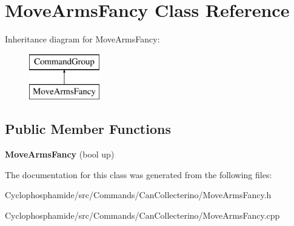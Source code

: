 \hypertarget{class_move_arms_fancy}{}\section{Move\+Arms\+Fancy Class Reference}
\label{class_move_arms_fancy}
Inheritance diagram for Move\+Arms\+Fancy\+:\begin{figure}[H]
\begin{center}
\leavevmode
\includegraphics[height=2.000000cm]{class_move_arms_fancy}
\end{center}
\end{figure}
\subsection*{Public Member Functions}
\begin{DoxyCompactItemize}
\item 
\hypertarget{class_move_arms_fancy_ae10b5c866d4d2ae7585ad127a942805e}{}{\bfseries Move\+Arms\+Fancy} (bool up)\label{class_move_arms_fancy_ae10b5c866d4d2ae7585ad127a942805e}

\end{DoxyCompactItemize}


The documentation for this class was generated from the following files\+:\begin{DoxyCompactItemize}
\item 
Cyclophosphamide/src/\+Commands/\+Can\+Collecterino/Move\+Arms\+Fancy.\+h\item 
Cyclophosphamide/src/\+Commands/\+Can\+Collecterino/Move\+Arms\+Fancy.\+cpp\end{DoxyCompactItemize}
